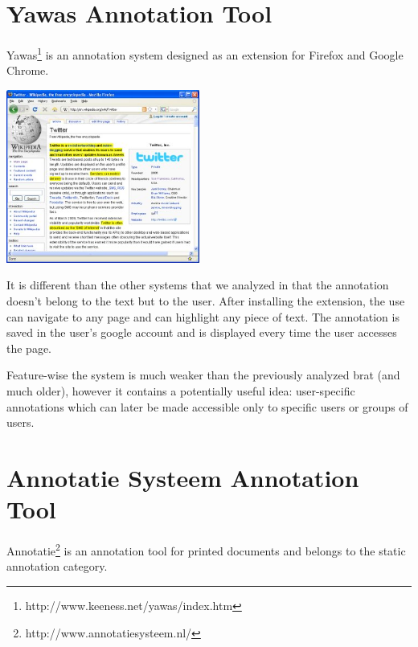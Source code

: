 \documentclass[11pt]{bluenote}
\begin{document}
\section{Yawas Annotation Tool} %
Yawas\footnote{http://www.keeness.net/yawas/index.htm} is an annotation system designed as an extension for Firefox and Google Chrome.\\[0.1in]
\begin{center}
\includegraphics[width=2.5in]{yawas.jpg}
\end{center}
It is different than the other systems that we analyzed in that the annotation doesn't belong to the text but to the user. After installing the extension, the use can navigate to any page
and can highlight any piece of text. The annotation is saved in the user's google account and is displayed every time the user accesses the page.\vspace{10pt}

Feature-wise the system is much weaker than the previously analyzed brat (and much older), however it contains a potentially useful idea: user-specific annotations which can later be made accessible only to
specific users or groups of users.
 


\section{Annotatie Systeem Annotation Tool} %
Annotatie\footnote{http://www.annotatiesysteem.nl/} is an annotation tool for printed documents and belongs to the static annotation category.\vspace{10pt}
\end{document}
